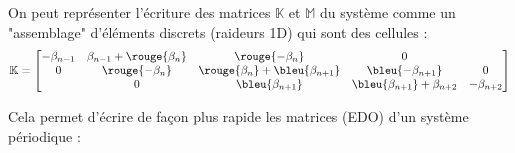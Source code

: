 \documentclass[12pt,a4paper]{article}
\begin{document}
	\newpage
	
	On peut représenter l'écriture des matrices $\mathbb{K}$ et $\mathbb{M}$ du système comme un "assemblage" d'éléments discrets (raideurs 1D) qui sont des cellules :\\
	\newlength{\x}
	\setlength{\x}{1cm}
	\newlength{\y}
	\setlength{\y}{1.5cm}
	\[\mathbb{K} = \left[\begin{matrix}
		-\beta_{n-1} & \beta_{n-1}+\rouge{\beta_n} & \rouge{-\beta_n} & 0 &  \\
		0 & \rouge{-\beta_n} & \rouge{\beta_n} + \bleu{\beta_{n+1}} & \bleu{-\beta_{n+1}} & 0 \\
		& 0 & \bleu{\beta_{n+1}} & \bleu{\beta_{n+1}} + \beta_{n+2} & - \beta_{n+2}
	\end{matrix}\right]\]
	
	Cela permet d'écrire de façon plus rapide les matrices (EDO) d'un système périodique :
	
\end{document}
